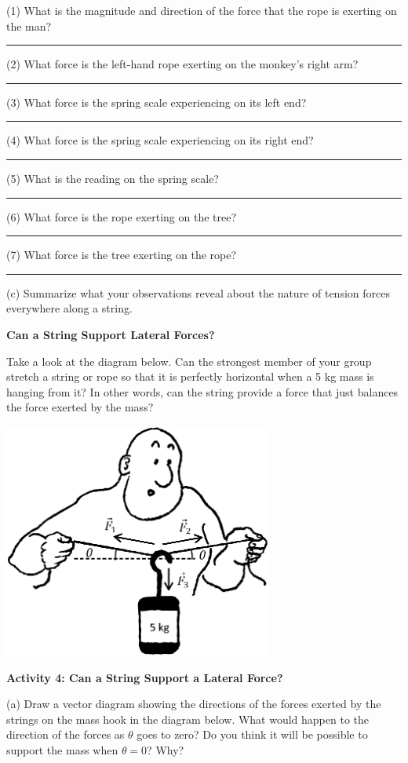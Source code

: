 (1) What is the magnitude and direction of the force that the rope is exerting
on the man? \rule{1.0in}{0.1pt}

(2) What force is the left-hand rope exerting on the monkey's right arm? \rule{1.0in}{0.1pt}

(3) What force is the spring scale experiencing on its left end? \rule{1.0in}{0.1pt}

(4) What force is the spring scale experiencing on its right end? \rule{1.0in}{0.1pt}

(5) What is the reading on the spring scale? \rule{1.0in}{0.1pt}

(6) What force is the rope exerting on the tree? \rule{1.0in}{0.1pt}

(7) What force is the tree exerting on the rope? \rule{1.0in}{0.1pt}

(c) Summarize what your observations reveal about the nature of tension forces
everywhere along a string.
\answerspace{15mm}

\textbf{Can a String Support Lateral Forces? }

Take a look at the diagram below. Can the strongest member of your group stretch
a string or rope so that it is perfectly horizontal when a 5 kg mass is hanging
from it? In other words, can the string provide a force that just balances the
force exerted by the mass?

{\par\centering \includegraphics[width=3.5in]{newton/newton_fig7_new.eps} \par}

\pagebreak[3]
\textbf{Activity 4: Can a String Support a Lateral Force?} 

(a) Draw a vector diagram showing the directions of the forces exerted by the
strings on the mass hook in the diagram below. What would happen to the direction
of the forces as \( \theta  \) goes to zero? Do you think it will be possible
to support the mass when $\theta  = 0$? Why?

